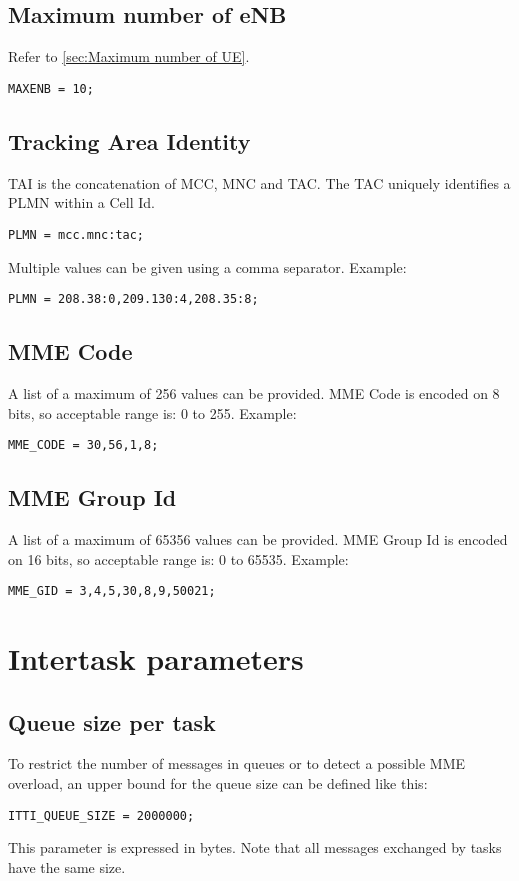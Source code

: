 \documentclass[a4paper,oneside]{report}
\begin{document}
\subsection{Maximum number of eNB}
Refer to \ref{sec:Maximum number of UE}.
\begin{lstlisting}
MAXENB = 10;
\end{lstlisting}

\subsection{Tracking Area Identity}
TAI is the concatenation of
MCC, MNC and
TAC.
The TAC uniquely identifies a PLMN within a Cell Id.
\begin{lstlisting}
PLMN = mcc.mnc:tac;
\end{lstlisting}
Multiple values can be given using a comma separator. Example:
\begin{lstlisting}
PLMN = 208.38:0,209.130:4,208.35:8;
\end{lstlisting}

\subsection{MME Code}
A list of a maximum of 256 values can be provided.
MME Code is encoded on 8 bits,
so acceptable range is: 0 to 255.
Example:
\begin{lstlisting}
MME_CODE = 30,56,1,8;
\end{lstlisting}

\subsection{MME Group Id}
A list of a maximum of 65356 values can be provided.
MME Group Id is encoded on 16 bits,
so acceptable range is: 0 to 65535.
Example:
\begin{lstlisting}
MME_GID = 3,4,5,30,8,9,50021;
\end{lstlisting}

\section{Intertask parameters}
\subsection{Queue size per task}
To restrict the number of messages in queues or to detect a possible MME overload,
an upper bound for the queue size can be defined like this:
\begin{lstlisting}
ITTI_QUEUE_SIZE = 2000000;
\end{lstlisting}
This parameter is expressed in bytes. Note that all messages exchanged by tasks
have the same size.
\end{document}
